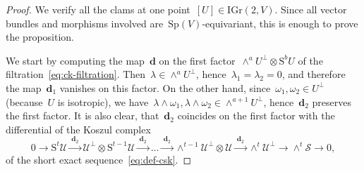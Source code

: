 \documentclass[a4paper]{article}
\newcommand{\Sp}{\mathrm{Sp}}
\newcommand{\IGr}{\mathrm{IGr}}
\newcommand{\cU}{\mathcal{U}}
\newcommand{\cS}{\mathcal{S}}
\newcommand{\Sy}{\mathrm{S}}
\newcommand{\vn}{\mathbf{d}}
\theoremstyle{remark}
\theoremstyle{definition}
\begin{document}
\begin{proof}
We verify all the clams at one point~\([U] \in \IGr(2,V)\).
Since all vector bundles and morphisms involved are~\(\Sp(V)\)-equivariant, this is enough to prove the proposition.

We start by computing the map~\(\vn\) on the first factor~\(\wedge^a U^\perp \otimes \Sy^b U\) of the filtration~\eqref{eq:ck-filtration}.
Then~\mbox{\(\lambda \in \wedge^aU^\perp\)}, hence~\(\lambda_1 = \lambda_2 = 0\), and therefore
the map~\(\vn_1\) vanishes on this factor.
On the other hand, since~\(\omega_1,\omega_2 \in U^\perp\) (because~\(U\) is isotropic), 
we have~\(\lambda \wedge \omega_1, \lambda \wedge \omega_2 \in \wedge^{a+1}U^\perp\), 
hence~\(\vn_2\) preserves the first factor. 
It is also clear, that~\(\vn_2\) coincides on the first factor with the differential of the Koszul complex
\begin{equation}
\label{eq:koszul-cs}
0 \to
\Sy^t \cU \xrightarrow{\ \vn_2\ }
\cU^\perp \otimes \Sy^{t-1} \cU \xrightarrow{\ \vn_2\ }
\dots \xrightarrow{\ \vn_2\ }
\wedge^{t -1} \cU^\perp \otimes \cU \xrightarrow{\ \vn_2\ }
\wedge^{t} \cU^\perp \to
\wedge^t\cS \to 
0,
\end{equation}
of the short exact sequence~\eqref{eq:def-csk}.



\end{proof}
\end{document}
